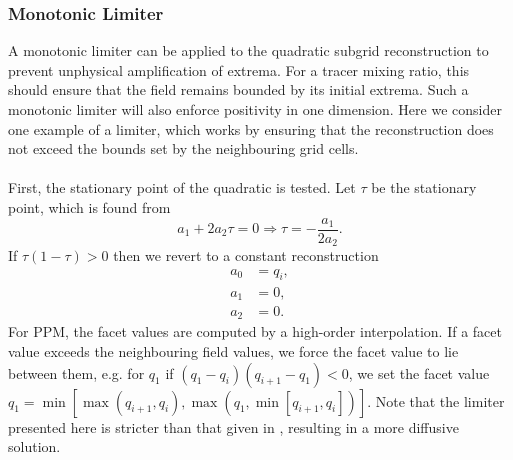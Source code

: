 \documentclass[11pt,a4paper]{article}
\begin{document}
\subsubsection{Monotonic Limiter} \label{sec:limiter}
A monotonic limiter can be applied to the quadratic subgrid reconstruction to prevent unphysical amplification of extrema.
For a tracer mixing ratio, this should ensure that the field remains bounded by its initial extrema.
Such a monotonic limiter will also enforce positivity in one dimension. 
Here we consider one example of a limiter, which works by ensuring that the reconstruction does not exceed the bounds set by the neighbouring grid cells.  \\
\\
First, the stationary point of the quadratic is tested. Let $\tau$ be the stationary point, which is found from
\begin{equation}
a_1 + 2 a_2 \tau  = 0 \Rightarrow \tau = - \frac{a_1}{2 a_2}. 
\end{equation}
If $\tau(1-\tau) > 0$ then we revert to a constant reconstruction
\begin{subequations}
\begin{align}
    a_0 &= q_i, \\
    a_1 &= 0, \\
    a_2 &= 0.
\end{align}
\end{subequations}
For PPM, the facet values are computed by a high-order interpolation. If a facet value exceeds the neighbouring field values, we force the facet value to lie between them, e.g. for $q_1$ if $(q_1 - q_i)( q_{i+1} - q_1) < 0$, we set the facet value $q_1 = \min[ \max(q_{i+1},q_i), \max(q_1, \min[q_{i+1},q_i]) ]$. Note that the limiter presented here is stricter than that given in \citep{colella1984ppm}, resulting in a more diffusive solution. 
\end{document}
